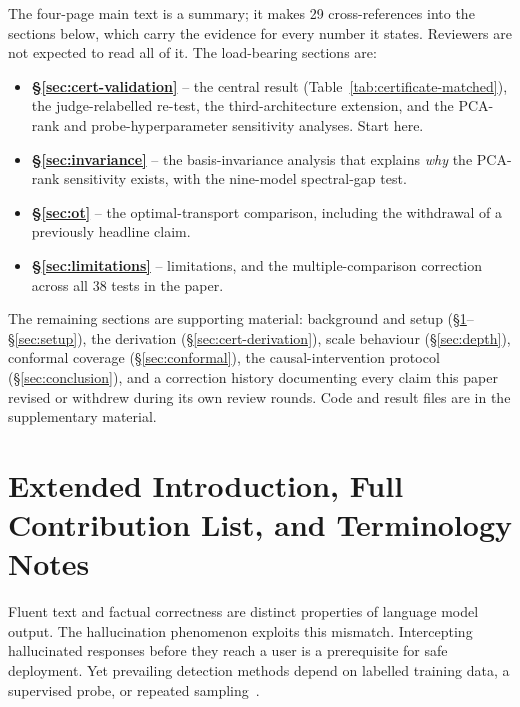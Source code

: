 \documentclass[onecolumn]{jmlr}
\begin{document}
The four-page main text is a summary; it makes 29 cross-references into the
sections below, which carry the evidence for every number it states. Reviewers
are not expected to read all of it. The load-bearing sections are:

\begin{itemize}\itemsep1pt
\item \textbf{\S\ref{sec:cert-validation}} -- the central result
  (Table~\ref{tab:certificate-matched}), the judge-relabelled re-test, the
  third-architecture extension, and the PCA-rank and probe-hyperparameter
  sensitivity analyses. Start here.
\item \textbf{\S\ref{sec:invariance}} -- the basis-invariance analysis that
  explains \emph{why} the PCA-rank sensitivity exists, with the nine-model
  spectral-gap test.
\item \textbf{\S\ref{sec:ot}} -- the optimal-transport comparison, including
  the withdrawal of a previously headline claim.
\item \textbf{\S\ref{sec:limitations}} -- limitations, and the
  multiple-comparison correction across all 38 tests in the paper.
\end{itemize}

The remaining sections are supporting material: background and setup
(\S\ref{sec:intro}--\S\ref{sec:setup}), the derivation
(\S\ref{sec:cert-derivation}), scale behaviour (\S\ref{sec:depth}), conformal
coverage (\S\ref{sec:conformal}), the causal-intervention protocol
(\S\ref{sec:conclusion}), and a correction history documenting every claim this
paper revised or withdrew during its own review rounds. Code and result files
are in the supplementary material.


\section{Extended Introduction, Full Contribution List, and Terminology Notes}
\label{sec:intro}

Fluent text and factual correctness are distinct properties of language
model output. The hallucination phenomenon exploits this mismatch.
Intercepting hallucinated responses before they reach a user is a
prerequisite for safe deployment. Yet prevailing detection methods
depend on labelled training data, a supervised probe, or repeated
sampling~\citep{manakul2023selfcheckgpt,chen2024inside}.
\end{document}
